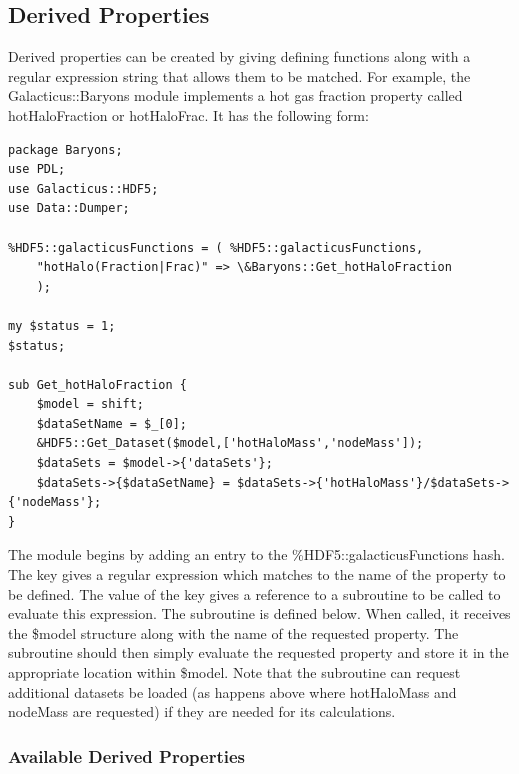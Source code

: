 \subsection{Derived Properties}

Derived properties can be created by giving defining functions along with a regular expression string that allows them to be matched. For example, the {\normalfont \ttfamily Galacticus::Baryons} module implements a hot gas fraction property called {\normalfont \ttfamily hotHaloFraction} or {\normalfont \ttfamily hotHaloFrac}. It has the following form:
\begin{verbatim}
package Baryons;
use PDL;
use Galacticus::HDF5;
use Data::Dumper;

%HDF5::galacticusFunctions = ( %HDF5::galacticusFunctions,
    "hotHalo(Fraction|Frac)" => \&Baryons::Get_hotHaloFraction
    );

my $status = 1;
$status;

sub Get_hotHaloFraction {
    $model = shift;
    $dataSetName = $_[0];
    &HDF5::Get_Dataset($model,['hotHaloMass','nodeMass']);
    $dataSets = $model->{'dataSets'};
    $dataSets->{$dataSetName} = $dataSets->{'hotHaloMass'}/$dataSets->{'nodeMass'};
}

\end{verbatim}
The module begins by adding an entry to the {\normalfont \ttfamily \%HDF5::galacticusFunctions} hash. The key gives a regular expression which matches to the name of the property to be defined. The value of the key gives a reference to a subroutine to be called to evaluate this expression. The subroutine is defined below. When called, it receives the {\normalfont \ttfamily \$model} structure along with the name of the requested property. The subroutine should then simply evaluate the requested property and store it in the appropriate location within {\normalfont \ttfamily \$model}. Note that the subroutine can request additional datasets be loaded (as happens above where {\normalfont \ttfamily hotHaloMass} and {\normalfont \ttfamily nodeMass} are requested) if they are needed for its calculations.

\subsubsection{Available Derived Properties}\label{sec:DerivedProperties}

